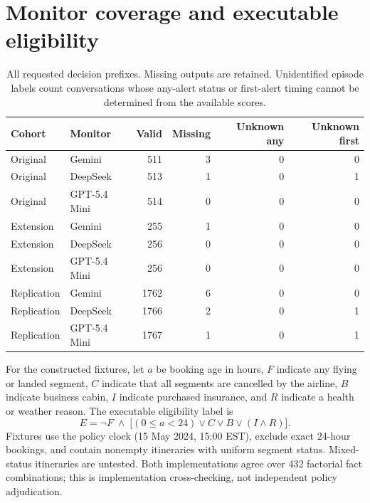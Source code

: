 \section{Monitor coverage and executable eligibility}
\begin{table}[h]\centering\small
\caption{All requested decision prefixes. Missing outputs are retained. Unidentified episode labels count conversations whose any-alert status or first-alert timing cannot be determined from the available scores.}\label{tab:coverage}
\begin{tabular}{llrrrr}
\toprule
Cohort & Monitor & Valid & Missing & Unknown any & Unknown first\\
\midrule
Original & Gemini & 511 & 3 & 0 & 0\\
Original & DeepSeek & 513 & 1 & 0 & 1\\
Original & GPT-5.4 Mini & 514 & 0 & 0 & 0\\
Extension & Gemini & 255 & 1 & 0 & 0\\
Extension & DeepSeek & 256 & 0 & 0 & 0\\
Extension & GPT-5.4 Mini & 256 & 0 & 0 & 0\\
Replication & Gemini & 1762 & 6 & 0 & 0\\
Replication & DeepSeek & 1766 & 2 & 0 & 1\\
Replication & GPT-5.4 Mini & 1767 & 1 & 0 & 1\\
\bottomrule
\end{tabular}
\end{table}
For the constructed fixtures, let $a$ be booking age in hours, $F$ indicate any flying or landed segment, $C$ indicate that all segments are cancelled by the airline, $B$ indicate business cabin, $I$ indicate purchased insurance, and $R$ indicate a health or weather reason. The executable eligibility label is
\[ E=\neg F\;\land\;\bigl[(0\leq a<24)\lor C\lor B\lor(I\land R)\bigr]. \]
Fixtures use the policy clock (15 May 2024, 15:00 EST), exclude exact 24-hour bookings, and contain nonempty itineraries with uniform segment status. Mixed-status itineraries are untested. Both implementations agree over 432 factorial fact combinations; this is implementation cross-checking, not independent policy adjudication.
